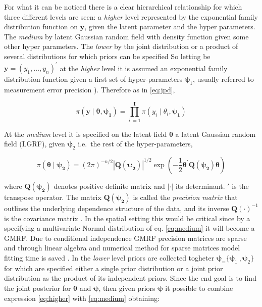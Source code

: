 \documentclass[
  12pt,
  a4paper,
  oneside]{book}
\theoremstyle{definition}
\theoremstyle{definition}
\theoremstyle{definition}
\theoremstyle{remark}
\begin{document}
For what it can be noticed there is a clear hierarchical relationship for which three different levels are seen: a \emph{higher} level represented by the exponential family distribution function on \(\mathbf{y}\), given the latent parameter and the hyper parameters. The \emph{medium} by latent Gaussian random field with density function given some other hyper parameters. The \emph{lower} by the joint distribution or a product of several distributions for which priors can be specified
So letting be \(\boldsymbol{\mathbf{y}}=\left(y_{1}, \ldots, y_{n}\right)^{\prime}\) at the \emph{higher} level it is assumed an exponential family distribution function given a first set of hyper-parameters \(\boldsymbol\psi_1\), usually referred to measurement error precision \citet{Blangiardo-Cameletti}). Therefore as in \eqref{eq:jpd},

\begin{equation}
  \pi(\boldsymbol{\mathbf{y}} \mid \boldsymbol{\theta}, \boldsymbol{\psi_1})=\prod_{i\ = 1}^{\mathbf{I}} \pi\left(y_{i} \mid \theta_{i}, \boldsymbol{\psi_1}\right)
\label{eq:higher}
\end{equation}

At the \emph{medium} level it is specified on the latent field \(\boldsymbol\theta\) a latent Gaussian random field (LGRF), given \(\boldsymbol\psi_2\) i.e.~the rest of the hyper-parameters,

\begin{equation}
  \pi(\boldsymbol{\theta} \mid \boldsymbol{\psi_2})=(2 \pi)^{-n / 2}| \boldsymbol{Q(\psi_2)}|^{1 / 2} \exp \left(-\frac{1}{2} \boldsymbol{\theta}^{\prime} \boldsymbol{Q(\psi_2)} \boldsymbol{\theta}\right)
\label{eq:medium}
\end{equation}

where \(\boldsymbol{Q(\psi_2)}\) denotes positive definite matrix and \(|\cdot|\) its determinant. \(\prime\) is the transpose operator. The matrix \(\boldsymbol{Q(\psi_2)}\) is called the \emph{precision matrix} that outlines the underlying dependence structure of the data, and its inverse \(\boldsymbol{Q(\cdot)}^{-1}\) is the covariance matrix \citep{wang2018bayesian}. In the spatial setting this would be critical since by a specifying a multivariate Normal distribution of eq. \eqref{eq:medium} it will become a GMRF. Due to conditional independence GMRF precision matrices are sparse and through linear algebra and numerical method for sparse matrices model fitting time is saved \citep{GMRFRue}.
In the \emph{lower} level priors are collected togheter \(\boldsymbol\psi_ =\{ \boldsymbol\psi_1\ , \boldsymbol\psi_2\}\) for which are specified either a single prior distribution or a joint prior distribution as the product of its independent priors.
Since the end goal is to find the joint posterior for \(\boldsymbol\theta\) and \(\boldsymbol\psi\), then given priors \(\boldsymbol\psi\) it possible to combine expression \eqref{eq:higher} with \eqref{eq:medium} obtaining:
\end{document}
